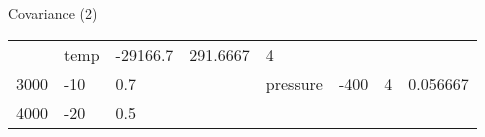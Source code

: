 \documentclass[compress]{beamer}
\begin{document}
\begin{frame}{Covariance (2)}
\begin{longtable}[c]{@{}llllllll@{}}
\begin{minipage}[t]{0.10\columnwidth}
\strut\end{minipage} &
\begin{minipage}[t]{0.10\columnwidth}\raggedright\strut
temp
\strut\end{minipage} &
\begin{minipage}[t]{0.10\columnwidth}\raggedright\strut
-29166.7
\strut\end{minipage} &
\begin{minipage}[t]{0.10\columnwidth}\raggedright\strut
291.6667
\strut\end{minipage} &
\begin{minipage}[t]{0.10\columnwidth}\raggedright\strut
4
\strut\end{minipage}\tabularnewline
\begin{minipage}[t]{0.10\columnwidth}\raggedright\strut
3000
\strut\end{minipage} &
\begin{minipage}[t]{0.10\columnwidth}\raggedright\strut
-10
\strut\end{minipage} &
\begin{minipage}[t]{0.10\columnwidth}\raggedright\strut
0.7
\strut\end{minipage} &
\begin{minipage}[t]{0.10\columnwidth}\raggedright\strut
\strut\end{minipage} &
\begin{minipage}[t]{0.10\columnwidth}\raggedright\strut
pressure
\strut\end{minipage} &
\begin{minipage}[t]{0.10\columnwidth}\raggedright\strut
-400
\strut\end{minipage} &
\begin{minipage}[t]{0.10\columnwidth}\raggedright\strut
4
\strut\end{minipage} &
\begin{minipage}[t]{0.10\columnwidth}\raggedright\strut
0.056667
\strut\end{minipage}\tabularnewline
\begin{minipage}[t]{0.10\columnwidth}\raggedright\strut
4000
\strut\end{minipage} &
\begin{minipage}[t]{0.10\columnwidth}\raggedright\strut
-20
\strut\end{minipage} &
\begin{minipage}[t]{0.10\columnwidth}\raggedright\strut
0.5
\strut\end{minipage} &
\begin{minipage}[t]{0.10\columnwidth}\raggedright\strut

\end{minipage}
\end{longtable}
\end{frame}
\end{document}
